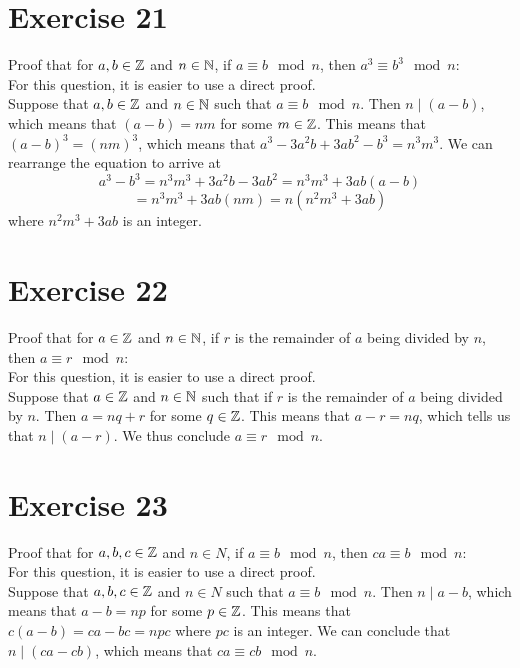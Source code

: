 \documentclass[12pt]{article}
\begin{document}
    \section*{Exercise 21}
    Proof that for $a, b \in \mathbb{Z}$ and $n \in \mathbb{N}$,
    if $a \equiv b \mod n$,
    then $a^3 \equiv b^3 \mod n$: \\
    For this question, it is easier to use a direct proof. \\
    Suppose that $a, b \in \mathbb{Z}$ and $n \in \mathbb{N}$
    such that $a \equiv b \mod n$.
    Then $n \mid (a - b)$,
    which means that $(a-b) = nm$ for some $m \in \mathbb{Z}$.
    This means that $(a-b)^3 = (nm)^3$,
    which means that $a^3 - 3a^2b + 3ab^2 - b^3 = n^3m^3$.
    We can rearrange the equation to arrive at
    \[ a^3 - b^3 = n^3m^3 + 3a^2b - 3ab^2 = n^3m^3 + 3ab(a-b) \]
    \[ = n^3m^3 + 3ab(nm) = n(n^2m^3 + 3ab) \]
    where $n^2m^3 + 3ab$ is an integer.

    \section*{Exercise 22}
    Proof that for $a \in \mathbb{Z}$ and $n \in \mathbb{N}$,
    if $r$ is the remainder of $a$ being divided by $n$,
    then $a \equiv r \mod n$: \\
    For this question, it is easier to use a direct proof. \\
    Suppose that $a \in \mathbb{Z}$ and $n \in \mathbb{N}$ such that
    if $r$ is the remainder of $a$ being divided by $n$.
    Then $a = nq + r$ for some $q \in \mathbb{Z}$. 
    This means that $a - r = nq$,
    which tells us that $n \mid (a-r)$.
    We thus conclude $a \equiv r \mod n$. \\

    \section*{Exercise 23}
    Proof that for $a, b, c \in \mathbb{Z}$ and $n \in N$,
    if $a \equiv b \mod n$,
    then $ca \equiv b \mod n$: \\
    For this question, it is easier to use a direct proof. \\
    Suppose that $a, b, c \in \mathbb{Z}$ and $n \in N$
    such that $a \equiv b \mod n$.
    Then $n \mid a - b$,
    which means that $a-b = np$ for some $p \in \mathbb{Z}$.
    This means that $c(a-b) = ca - bc = npc$
    where $pc$ is an integer.
    We can conclude that $n \mid (ca - cb)$,
    which means that $ca \equiv cb \mod n$. \\
\end{document}
